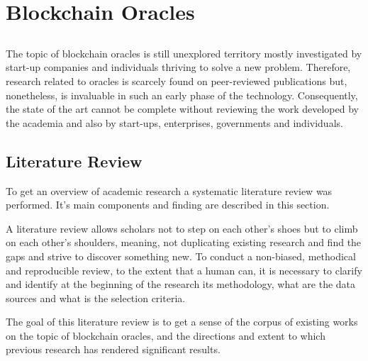 \chapter{Blockchain Oracles} \label{chap:sota}

\section*{}



The topic of blockchain oracles is still unexplored territory mostly investigated by start-up companies and individuals thriving to solve a new problem. Therefore, research related to oracles is scarcely found on peer-reviewed publications but, nonetheless, is invaluable in such an early phase of the technology. Consequently, the state of the art cannot be complete without reviewing the work developed by the academia and also by start-ups, enterprises, governments and individuals.

\section{Literature Review}

To get an overview of academic research a systematic literature review was performed. It's main components and finding are described in this section.

A literature review allows scholars not to step on each other's shoes but to climb on each other's shoulders, meaning, not duplicating existing research and find the gaps and strive to discover something new. To conduct a non-biased, methodical and reproducible review, to the extent that a human can, it is necessary to clarify and identify at the beginning of the research its methodology, what are the data sources and what is the selection criteria.

The goal of this literature review is to get a sense of the corpus of existing works on the topic of blockchain oracles, and the directions and extent to which previous research has rendered significant results.

